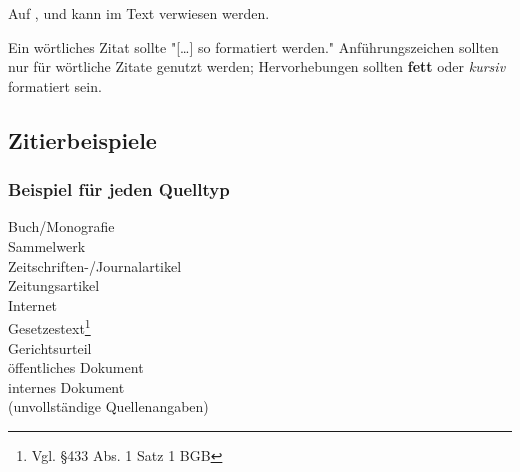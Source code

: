 

Auf ,  und  kann im Text verwiesen werden.%

Ein wörtliches Zitat sollte "[\ldots] so formatiert werden." %
Anführungszeichen sollten nur für wörtliche Zitate genutzt werden; Hervorhebungen sollten \textbf{fett} oder \textit{kursiv} formatiert sein.

\newpage
\subsection{Zitierbeispiele}
\subsubsection{Beispiel für jeden Quelltyp}%

Buch/Monografie\\
Sammelwerk\\
Zeitschriften-/Journalartikel\\
Zeitungsartikel\\
Internet\\%
Gesetzestext\footnote{Vgl. §433 Abs. 1 Satz 1 BGB}\nocite{bgb}\\
Gerichtsurteil\\
öffentliches Dokument\\
internes Dokument\\%
(unvollständige Quellenangaben)

